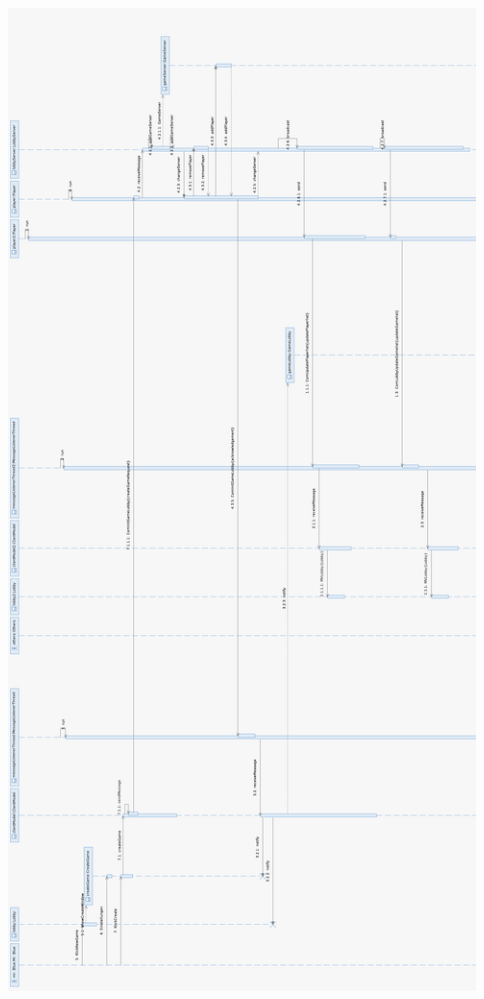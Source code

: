 \documentclass{article}
\begin{document}
\includegraphics[width=18cm, height = 26cm]{Entwurf_CreateGame2}
\newpage
\addtolength{\oddsidemargin}{4cm}
\addtolength{\topmargin}{4cm}
\end{document}
